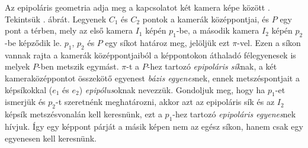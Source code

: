 Az epipoláris geometria adja meg a kapcsolatot két kamera képe között \cite[9. fejezet]{HZ}. Tekintsük . ábrát. Legyenek $C_1$ és $C_2$ pontok a kamerák középpontjai, és $P$ egy pont a térben, mely az első kamera $I_1$ képén $p_1$-be, a második kamera $I_2$ képén $p_2$-be képződik le. $p_1$, $p_2$ és $P$ egy síkot határoz meg, jelöljük ezt $\pi$-vel. Ezen a síkon vannak rajta a kamerák középpontjaiból a képpontokon áthaladó félegyenesek is melyek $P$-ben metszik egymást. $\pi$-t a $P$-hez tartozó \textit{epipoláris sík}nak, a két kameraközéppontot összekötő egyenest \textit{bázis egyenes}nek, ennek metszéspontjait a képsíkokkal ($e_1$ és $e_2$) \textit{epipólus}oknak nevezzük. Gondoljuk meg, hogy ha $p_1$-et ismerjük és $p_2$-t szeretnénk meghatározni, akkor azt az epipoláris sík és az $I_2$ képsík metszésvonalán kell keresnünk, ezt a $p_1$-hez tartozó \textit{epipoláris egyenes}nek hívjuk. Így egy képpont párját a másik képen nem az egész síkon, hanem csak egy egyenesen kell keresnünk.

